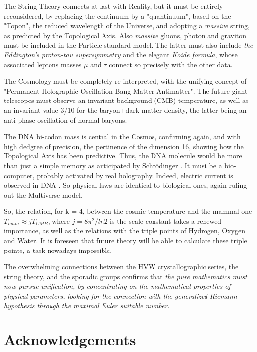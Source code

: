 \documentclass[a4paper,9pt]{article}
\begin{document}
The String Theory connects at last with Reality, but it must be entirely reconsidered, by replacing the continuum by a "quantinuum", based on the "Topon", the reduced wavelength of the Universe, and adopting a \textit{massive} string, as predicted by the Topological Axis. Also \textit{massive} gluons, photon and graviton must be included in the Particle standard model. The latter must also include \textit{the Eddington's proton-tau supersymmetry} and the elegant \textit{Koide formula}, whose associated leptons masses $\mu$ and $\tau $ connect so precisely with the other data. 

The Cosmology must be completely re-interpreted, with the unifying concept of "Permanent Holographic Oscillation Bang Matter-Antimatter". The future giant telescopes must observe an invariant background (CMB) temperature, as well as an invariant value 3/10 for the baryon+dark matter density, the latter being an anti-phase oscillation of normal baryons.

The DNA bi-codon mass is central in the Cosmos, confirming again, and with high dedgree of precision, the pertinence of the dimension 16, showing how the Topological Axis has been predictive. Thus, the DNA molecule would be more than just a simple memory as anticipated by Schrödinger \cite{Schrodinger}. It must be a bio-computer, probably activated by real holography. Indeed, electric current is observed in DNA \cite{Montagnier}. So physical laws are identical to biological ones, again ruling out the Multiverse model.

So, the relation, for k = 4, between the cosmic temperature and the mammal one $T_{mam}\approx jT_{CMB}$, where $j =  8 \pi^2/ln2$ is the scale constant \cite {Sanchez3} takes a renewed importance, as well as the relations with the triple points of Hydrogen, Oxygen and Water. It is foreseen that future theory will be able to calculate these triple points, a task nowadays impossible.

The overwhelming connections between the HVW crystallographic series, the string theory, and the sporadic groups confirms that \textit{the pure mathematics must now pursue unification, by concentrating on the mathematical properties of physical parameters, looking for the connection with the generalized Riemann hypothesis through the maximal Euler suitable number}.


 
 \section {Acknowledgements}
\end{document}
